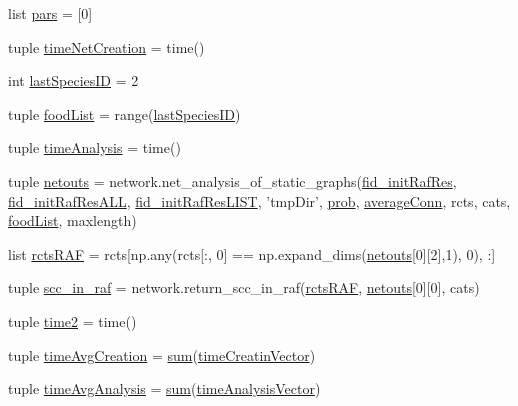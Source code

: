 \begin{DoxyCompactItemize}
\item 
list \hyperlink{a00128_a516f339905d01b02a4e16181f2fde4be}{pars} = \mbox{[}0\mbox{]}
\item 
tuple \hyperlink{a00128_a2f85d448268dd44ad47f66b65bfa45b6}{time\-Net\-Creation} = time()
\item 
int \hyperlink{a00128_a1aa5d59ebf308accb3c960b5fd90a445}{last\-Species\-I\-D} = 2
\item 
tuple \hyperlink{a00128_a96850fa3d62df1176a8d7a5b988f4a32}{food\-List} = range(\hyperlink{a00128_a1aa5d59ebf308accb3c960b5fd90a445}{last\-Species\-I\-D})
\item 
tuple \hyperlink{a00128_ace5bda70ff24e6a220afb4438240003a}{time\-Analysis} = time()
\item 
tuple \hyperlink{a00128_af42f57da8ba80463f419efaf0f6f2c33}{netouts} = network.\-net\-\_\-analysis\-\_\-of\-\_\-static\-\_\-graphs(\hyperlink{a00128_aa47d62b7ce95f5c4e730d081209770c2}{fid\-\_\-init\-Raf\-Res}, \hyperlink{a00128_afcacf140d9efed55635e8dcd084db870}{fid\-\_\-init\-Raf\-Res\-A\-L\-L}, \hyperlink{a00128_abca13a03834449d5629252329999f1a3}{fid\-\_\-init\-Raf\-Res\-L\-I\-S\-T}, 'tmp\-Dir', \hyperlink{a00128_aad2c05e3d2146196ed236911dd796f6e}{prob}, \hyperlink{a00128_a0d59133b2bb42e7aa26a3dba3a2a9a70}{average\-Conn}, rcts, cats, \hyperlink{a00128_a96850fa3d62df1176a8d7a5b988f4a32}{food\-List}, maxlength)
\item 
list \hyperlink{a00128_aeb909c76682b690cc5ab6aca5ac37c4d}{rcts\-R\-A\-F} = rcts\mbox{[}np.\-any(rcts\mbox{[}\-:, 0\mbox{]} == np.\-expand\-\_\-dims(\hyperlink{a00128_af42f57da8ba80463f419efaf0f6f2c33}{netouts}\mbox{[}0\mbox{]}\mbox{[}2\mbox{]},1), 0), \-:\mbox{]}
\item 
tuple \hyperlink{a00128_ac864e2a75b705766c1d81f68897f52c0}{scc\-\_\-in\-\_\-raf} = network.\-return\-\_\-scc\-\_\-in\-\_\-raf(\hyperlink{a00128_aeb909c76682b690cc5ab6aca5ac37c4d}{rcts\-R\-A\-F}, \hyperlink{a00128_af42f57da8ba80463f419efaf0f6f2c33}{netouts}\mbox{[}0\mbox{]}\mbox{[}0\mbox{]}, cats)
\item 
tuple \hyperlink{a00128_a44666efa43bfc08ab8305c8d325f7456}{time2} = time()
\item 
tuple \hyperlink{a00128_a4cd61f10a5a0a8d80608e71a1fc2009c}{time\-Avg\-Creation} = \hyperlink{a00021_a5330c3728d2e8d052841f1bbf8d33845}{sum}(\hyperlink{a00128_a0527a0989312340a402661aebc675d30}{time\-Creatin\-Vector})
\item 
tuple \hyperlink{a00128_a0689e49982e7bedba8ac4eb5534963db}{time\-Avg\-Analysis} = \hyperlink{a00021_a5330c3728d2e8d052841f1bbf8d33845}{sum}(\hyperlink{a00128_a3ddbda333425be797470f7d058e2c8a4}{time\-Analysis\-Vector})

\end{DoxyCompactItemize}

